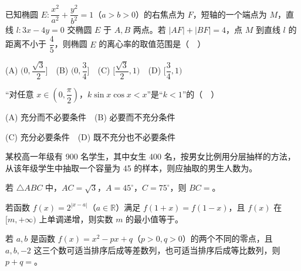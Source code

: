 \begin{question}

已知椭圆 \(E:\dfrac{x^2}{a^2}+\dfrac{y^2}{b^2}=1\)（\(a>b>0\)）的右焦点为 \(F\)，短轴的一个端点为 \(M\)，直线 \(l:3x-4y=0\) 交椭圆 \(E\) 于 \(A,B\) 两点。若 \(|AF|+|BF|=4\)，点 \(M\) 到直线 \(l\) 的距离不小于 \(\dfrac45\)，则椭圆 \(E\) 的离心率的取值范围是（　）

(A) \((0,\dfrac{\sqrt3}{2}]\)　(B) \((0,\dfrac34]\)　(C) \([\dfrac{\sqrt3}{2},1)\)　(D) \([\dfrac34,1)\)

\end{question}
\begin{question}

“对任意 \(x\in(0,\dfrac\pi2)\)，\(k\sin x\cos x<x\)”是“\(k<1\)”的（　）

(A) 充分而不必要条件　(B) 必要而不充分条件

(C) 充分必要条件　(D) 既不充分也不必要条件

\end{question}

\begin{question}

某校高一年级有 900 名学生，其中女生 400 名，按男女比例用分层抽样的方法，从该年级学生中抽取一个容量为 45 的样本，则应抽取的男生人数为\gkblank{}。

\end{question}
\begin{question}

若 \(\triangle ABC\) 中，\(AC=\sqrt3\)，\(A=45^\circ\)，\(C=75^\circ\)，则 \(BC=\)\gkblank{}。

\end{question}
\begin{question}

若函数 \(f(x)=2^{|x-a|}\)（\(a\in\mathbb R\)）满足 \(f(1+x)=f(1-x)\)，且 \(f(x)\) 在 \([m,+\infty)\) 上单调递增，则实数 \(m\) 的最小值等于\gkblank{}。

\end{question}
\begin{question}

若 \(a,b\) 是函数 \(f(x)=x^2-px+q\)（\(p>0,q>0\)）的两个不同的零点，且 \(a,b,-2\) 这三个数可适当排序后成等差数列，也可适当排序后成等比数列，则 \(p+q=\)\gkblank{}。

\end{question}

